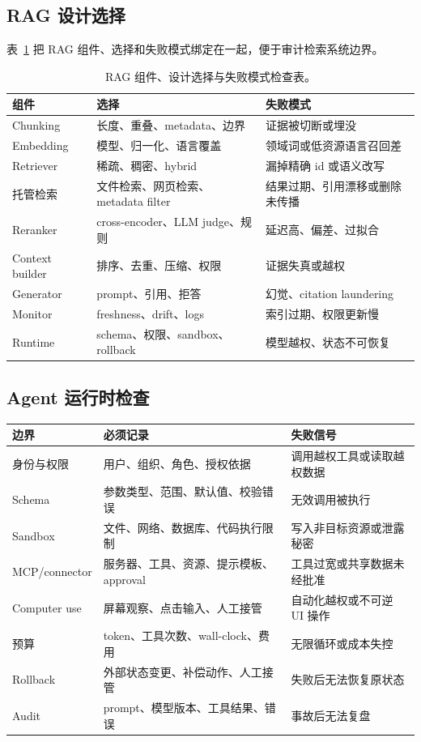 \documentclass[UTF8,zihao=-4,openany]{ctexbook}
\begin{document}
\subsection{RAG 设计选择}
表~\ref{tab:zh-rag-design-choices} 把 RAG 组件、选择和失败模式绑定在一起，便于审计检索系统边界。

\begin{table}[t]
\centering
\begin{tabular}{p{}p{}p{}}
\toprule
组件 & 选择 & 失败模式 \\
\midrule
Chunking & 长度、重叠、metadata、边界 & 证据被切断或埋没 \\
Embedding & 模型、归一化、语言覆盖 & 领域词或低资源语言召回差 \\
Retriever & 稀疏、稠密、hybrid & 漏掉精确 id 或语义改写 \\
托管检索 & 文件检索、网页检索、metadata filter & 结果过期、引用漂移或删除未传播 \\
Reranker & cross-encoder、LLM judge、规则 & 延迟高、偏差、过拟合 \\
Context builder & 排序、去重、压缩、权限 & 证据失真或越权 \\
Generator & prompt、引用、拒答 & 幻觉、citation laundering \\
Monitor & freshness、drift、logs & 索引过期、权限更新慢 \\
Runtime & schema、权限、sandbox、rollback & 模型越权、状态不可恢复 \\
\bottomrule
\end{tabular}
\caption{RAG 组件、设计选择与失败模式检查表。}
\label{tab:zh-rag-design-choices}
\end{table}

\subsection{Agent 运行时检查}
\begin{center}
\begin{tabular}{p{}p{}p{}}
\toprule
边界 & 必须记录 & 失败信号 \\
\midrule
身份与权限 & 用户、组织、角色、授权依据 & 调用越权工具或读取越权数据 \\
Schema & 参数类型、范围、默认值、校验错误 & 无效调用被执行 \\
Sandbox & 文件、网络、数据库、代码执行限制 & 写入非目标资源或泄露秘密 \\
MCP/connector & 服务器、工具、资源、提示模板、approval & 工具过宽或共享数据未经批准 \\
Computer use & 屏幕观察、点击输入、人工接管 & 自动化越权或不可逆 UI 操作 \\
预算 & token、工具次数、wall-clock、费用 & 无限循环或成本失控 \\
Rollback & 外部状态变更、补偿动作、人工接管 & 失败后无法恢复原状态 \\
Audit & prompt、模型版本、工具结果、错误 & 事故后无法复盘 \\
\bottomrule
\end{tabular}
\end{center}
\end{document}
